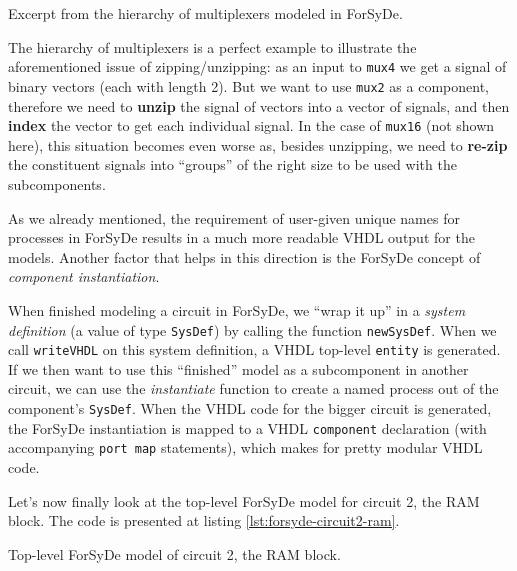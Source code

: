             \begin{listing}[h!]
                \caption{Excerpt from the hierarchy of multiplexers modeled in ForSyDe.
                    \label{lst:forsyde-circuit2-muxes}}
            \end{listing}

            The hierarchy of multiplexers is a perfect example to illustrate the aforementioned
            issue of zipping/unzipping: as an input to \texttt{mux4} we get a signal of binary
            vectors (each with length 2). But we want to use \texttt{mux2} as a component, therefore
            we need to \textbf{unzip} the signal of vectors into a vector of signals, and then
            \textbf{index} the vector to get each individual signal. In the case of \texttt{mux16}
            (not shown here), this situation becomes even worse as, besides unzipping, we need to
            \textbf{re-zip} the constituent signals into ``groups'' of the right size to be used
            with the subcomponents.

            As we already mentioned, the requirement of user-given unique names for processes in
            ForSyDe results in a much more readable VHDL output for the models. Another factor that
            helps in this direction is the ForSyDe concept of \emph{component instantiation}.

            When finished modeling a circuit in ForSyDe, we ``wrap it up'' in a \emph{system
                definition} (a value of type \texttt{SysDef}) by calling the function
            \texttt{newSysDef}. When we call \texttt{writeVHDL} on this system definition, a VHDL
            top-level \texttt{entity} is generated. If we then want to use this ``finished'' model
            as a subcomponent in another circuit, we can use the \emph{instantiate} function to
            create a named process out of the component's \texttt{SysDef}. When the VHDL code for
            the bigger circuit is generated, the ForSyDe instantiation is mapped to a VHDL
            \texttt{component} declaration (with accompanying \texttt{port map} statements), which
            makes for pretty modular VHDL code.

            Let's now finally look at the top-level ForSyDe model for circuit 2, the RAM block.  The
            code is presented at listing \ref{lst:forsyde-circuit2-ram}.

            \begin{listing}[h!]
                \caption{Top-level ForSyDe model of circuit 2, the RAM block.
                    \label{lst:forsyde-circuit2-ram}}
            \end{listing}

